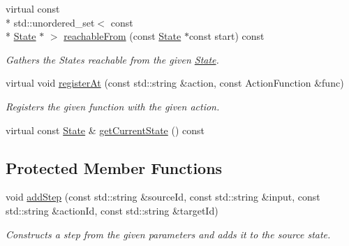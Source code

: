 \begin{DoxyCompactItemize}
\item 
virtual const \\*
std\-::unordered\-\_\-set$<$ const \\*
\hyperlink{classfsml_1_1State}{State} $\ast$ $>$ \hyperlink{classfsml_1_1Machine_a7d184c839fe996141a692152b9b37e0a}{reachable\-From} (const \hyperlink{classfsml_1_1State}{State} $\ast$const start) const 
\begin{DoxyCompactList}\small\item\em Gathers the States reachable from the given \hyperlink{classfsml_1_1State}{State}. \end{DoxyCompactList}\item 
virtual void \hyperlink{classfsml_1_1Machine_a51b789ab95db22995529818bed9fef20}{register\-At} (const std\-::string \&action, const Action\-Function \&func)
\begin{DoxyCompactList}\small\item\em Registers the given function with the given action. \end{DoxyCompactList}\item 
virtual const \hyperlink{classfsml_1_1State}{State} \& \hyperlink{classfsml_1_1Machine_a5bce113183b6d59b652b33f4369bb45c}{get\-Current\-State} () const 
\end{DoxyCompactItemize}
\subsection*{Protected Member Functions}
\begin{DoxyCompactItemize}
\item 
void \hyperlink{classfsml_1_1Machine_a863ac1a16a82e0fc0a8e85553061686f}{add\-Step} (const std\-::string \&source\-Id, const std\-::string \&input, const std\-::string \&action\-Id, const std\-::string \&target\-Id)
\begin{DoxyCompactList}\small\item\em Constructs a step from the given parameters and adds it to the source state. \end{DoxyCompactList}\end{DoxyCompactItemize}
